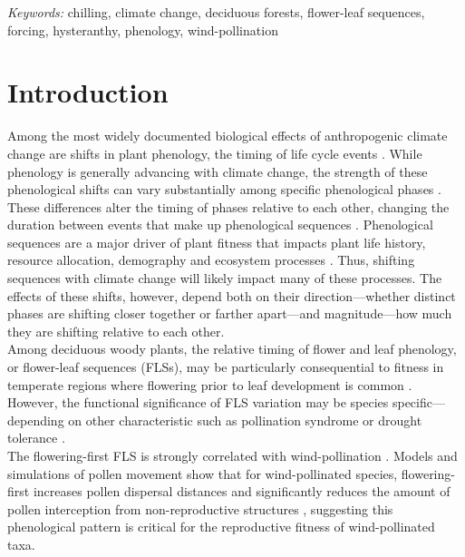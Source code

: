 \documentclass[12pt]{article}\usepackage[]{graphicx}\usepackage[]{color}
\begin{document}
\noindent \emph{Keywords:} chilling, climate change, deciduous forests, flower-leaf sequences, forcing, hysteranthy, phenology, wind-pollination  \\ 

\section*{Introduction}
\noindent Among the most widely documented biological effects of anthropogenic climate change are shifts in plant phenology, the timing of life cycle events \citep{Parmesan2003,Menzel2006,Cleland2007}. While phenology is generally advancing with climate change, the strength of these phenological shifts can vary substantially among specific phenological phases \citep{Augspurger:2020aa}. These differences alter the timing of phases relative to each other, changing the duration between events that make up phenological sequences \citep{Ettinger2018}. Phenological sequences are a major driver of plant fitness that impacts plant life history, resource allocation, demography and ecosystem processes \citep{Post:2008aa}. Thus, shifting sequences with climate change will likely impact many of these processes. The effects of these shifts, however, depend both on their direction---whether distinct phases are shifting closer together or farther apart---and magnitude---how much they are shifting relative to each other.\\ 

\noindent Among deciduous woody plants, the relative timing of flower and leaf phenology, or flower-leaf sequences (FLSs), may be particularly consequential to fitness in temperate regions where flowering prior to leaf development is common \citep{Rathcke_1985}. However, the functional significance of FLS variation may be species specific---depending on other characteristic such as pollination syndrome or drought tolerance \citep{Gougherty2018}. \\

\noindent The flowering-first FLS is strongly correlated with wind-pollination \citep{Buonaiuto2020, Friedman2009}. Models and simulations of pollen movement show that for wind-pollinated species, flowering-first increases pollen dispersal distances and significantly reduces the amount of pollen interception from non-reproductive structures \citep{Di-Giovanni:1989aa,Tauber1967,Whitehead1969}, suggesting this phenological pattern is critical for the reproductive fitness of wind-pollinated taxa.\\ 
\end{document}
